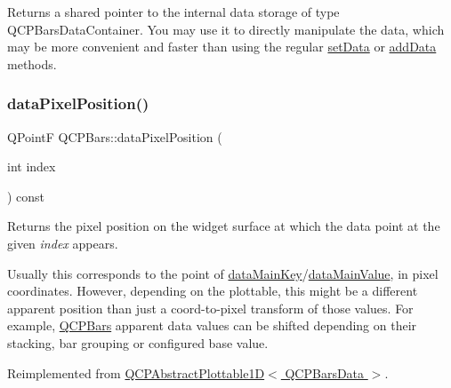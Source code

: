 Returns a shared pointer to the internal data storage of type Q\+C\+P\+Bars\+Data\+Container. You may use it to directly manipulate the data, which may be more convenient and faster than using the regular \hyperlink{classQCPBars_a6dc562ec7120a8521e1061f2134367e4}{set\+Data} or \hyperlink{classQCPBars_a323d6970d6d6e3166d89916a7f60f733}{add\+Data} methods. \mbox{\label{classQCPBars_a55cdaf565cd3384158d1f7f89533bc2d}} 
\subsubsection{\texorpdfstring{data\+Pixel\+Position()}{dataPixelPosition()}}
{\footnotesize\ttfamily Q\+PointF Q\+C\+P\+Bars\+::data\+Pixel\+Position (\begin{DoxyParamCaption}\item[{int}]{index }\end{DoxyParamCaption}) const\hspace{0.3cm}{\ttfamily [virtual]}}





Returns the pixel position on the widget surface at which the data point at the given {\itshape index} appears.

Usually this corresponds to the point of \hyperlink{classQCPAbstractPlottable1D_aeb156ebf5d3c8de906b428be30733ad8}{data\+Main\+Key}/\hyperlink{classQCPAbstractPlottable1D_a6be0f657ba85a1688336d76ad649ecf2}{data\+Main\+Value}, in pixel coordinates. However, depending on the plottable, this might be a different apparent position than just a coord-\/to-\/pixel transform of those values. For example, \hyperlink{classQCPBars}{Q\+C\+P\+Bars} apparent data values can be shifted depending on their stacking, bar grouping or configured base value. 

Reimplemented from \hyperlink{classQCPAbstractPlottable1D_a6ca0699a6af5f25a7565de7c50ce13b2}{Q\+C\+P\+Abstract\+Plottable1\+D$<$ Q\+C\+P\+Bars\+Data $>$}.

\mbox{\label{classQCPBars_ac5a3854774d9d9cd129b1eae1426de2d}} 
